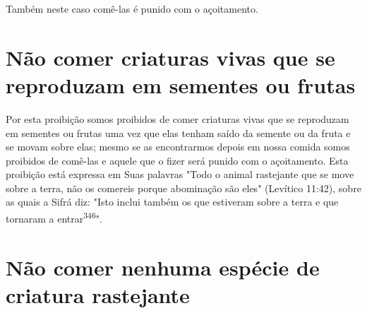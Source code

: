 \begin{itemize}
\begin{enumrate}
\begin{itemize}
\begin{itemize}
\begin{itemize}
Também neste caso comê-las é punido com o açoitamento.

\section{Não comer criaturas vivas que se reproduzam em sementes ou frutas}

Por esta proibição somos proibidos de comer criaturas vivas que se
reproduzam em sementes ou frutas uma vez que elas tenham saído da
semente ou da fruta e se movam sobre elas; mesmo se as encontrarmos
depois em nossa comida somos proibidos de comê-las e aquele que o fizer
será punido com o açoitamento. Esta proibição está expressa em Suas
palavras "Todo o animal ras­tejante que se move sobre a terra, não os
comereis porque abominação são eles" (Levítico 11:42), sobre as quais a
Sifrá diz: "Isto inclui também os que estive­ram sobre a terra e que
tornaram a entrar\textsuperscript{346}".

\section{Não comer nenhuma espécie de criatura rastejante}


\end{itemize}
\end{itemize}
\end{itemize}
\end{enumrate}
\end{itemize}
